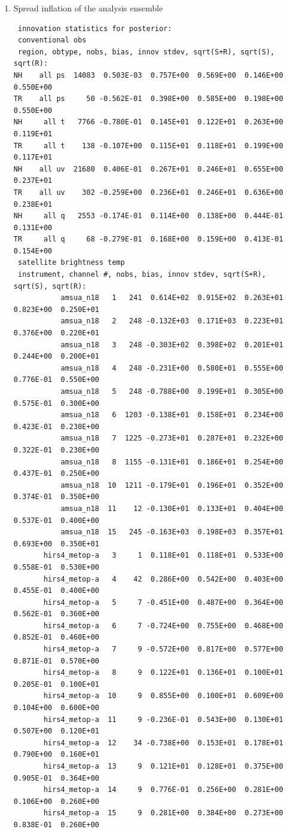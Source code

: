\begin{enumerate}
\item Spread inflation of the analysis ensemble
\begin{footnotesize}
\begin{verbatim}
 innovation statistics for posterior:
 conventional obs
 region, obtype, nobs, bias, innov stdev, sqrt(S+R), sqrt(S), sqrt(R):
NH    all ps  14083  0.503E-03  0.757E+00  0.569E+00  0.146E+00  0.550E+00
TR    all ps     50 -0.562E-01  0.398E+00  0.585E+00  0.198E+00  0.550E+00
NH     all t   7766 -0.780E-01  0.145E+01  0.122E+01  0.263E+00  0.119E+01
TR     all t    138 -0.107E+00  0.115E+01  0.118E+01  0.199E+00  0.117E+01
NH    all uv  21680  0.406E-01  0.267E+01  0.246E+01  0.655E+00  0.237E+01
TR    all uv    302 -0.259E+00  0.236E+01  0.246E+01  0.636E+00  0.238E+01
NH     all q   2553 -0.174E-01  0.114E+00  0.138E+00  0.444E-01  0.131E+00
TR     all q     68 -0.279E-01  0.168E+00  0.159E+00  0.413E-01  0.154E+00
 satellite brightness temp
 instrument, channel #, nobs, bias, innov stdev, sqrt(S+R), sqrt(S), sqrt(R):
           amsua_n18   1   241  0.614E+02  0.915E+02  0.263E+01  0.823E+00  0.250E+01
           amsua_n18   2   248 -0.132E+03  0.171E+03  0.223E+01  0.376E+00  0.220E+01
           amsua_n18   3   248 -0.303E+02  0.398E+02  0.201E+01  0.244E+00  0.200E+01
           amsua_n18   4   248 -0.231E+00  0.580E+01  0.555E+00  0.776E-01  0.550E+00
           amsua_n18   5   248 -0.788E+00  0.199E+01  0.305E+00  0.575E-01  0.300E+00
           amsua_n18   6  1203 -0.138E+01  0.158E+01  0.234E+00  0.423E-01  0.230E+00
           amsua_n18   7  1225 -0.273E+01  0.287E+01  0.232E+00  0.322E-01  0.230E+00
           amsua_n18   8  1155 -0.131E+01  0.186E+01  0.254E+00  0.437E-01  0.250E+00
           amsua_n18  10  1211 -0.179E+01  0.196E+01  0.352E+00  0.374E-01  0.350E+00
           amsua_n18  11    12 -0.130E+01  0.133E+01  0.404E+00  0.537E-01  0.400E+00
           amsua_n18  15   245 -0.163E+03  0.198E+03  0.357E+01  0.693E+00  0.350E+01
       hirs4_metop-a   3     1  0.118E+01  0.118E+01  0.533E+00  0.558E-01  0.530E+00
       hirs4_metop-a   4    42  0.286E+00  0.542E+00  0.403E+00  0.455E-01  0.400E+00
       hirs4_metop-a   5     7 -0.451E+00  0.487E+00  0.364E+00  0.562E-01  0.360E+00
       hirs4_metop-a   6     7 -0.724E+00  0.755E+00  0.468E+00  0.852E-01  0.460E+00
       hirs4_metop-a   7     9 -0.572E+00  0.817E+00  0.577E+00  0.871E-01  0.570E+00
       hirs4_metop-a   8     9  0.122E+01  0.136E+01  0.100E+01  0.205E-01  0.100E+01
       hirs4_metop-a  10     9  0.855E+00  0.100E+01  0.609E+00  0.104E+00  0.600E+00
       hirs4_metop-a  11     9 -0.236E-01  0.543E+00  0.130E+01  0.507E+00  0.120E+01
       hirs4_metop-a  12    34 -0.738E+00  0.153E+01  0.178E+01  0.790E+00  0.160E+01
       hirs4_metop-a  13     9  0.121E+01  0.128E+01  0.375E+00  0.905E-01  0.364E+00
       hirs4_metop-a  14     9  0.776E-01  0.256E+00  0.281E+00  0.106E+00  0.260E+00
       hirs4_metop-a  15     9  0.281E+00  0.384E+00  0.273E+00  0.838E-01  0.260E+00
\end{verbatim}
\end{footnotesize}


\end{enumerate}
